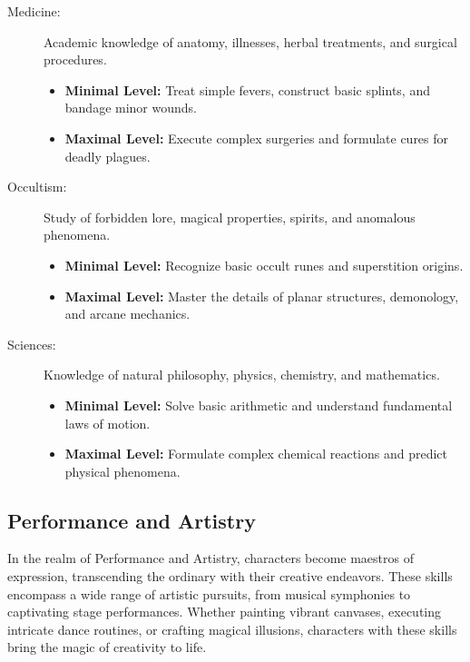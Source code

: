 \begin{description}
    \item[Medicine:] Academic knowledge of anatomy, illnesses, herbal treatments, and surgical procedures.
        \begin{itemize}
            \item \textbf{Minimal Level:} Treat simple fevers, construct basic splints, and bandage minor wounds.
            \item \textbf{Maximal Level:} Execute complex surgeries and formulate cures for deadly plagues.
        \end{itemize}

    \item[Occultism:] Study of forbidden lore, magical properties, spirits, and anomalous phenomena.
        \begin{itemize}
            \item \textbf{Minimal Level:} Recognize basic occult runes and superstition origins.
            \item \textbf{Maximal Level:} Master the details of planar structures, demonology, and arcane mechanics.
        \end{itemize}

    \item[Sciences:] Knowledge of natural philosophy, physics, chemistry, and mathematics.
        \begin{itemize}
            \item \textbf{Minimal Level:} Solve basic arithmetic and understand fundamental laws of motion.
            \item \textbf{Maximal Level:} Formulate complex chemical reactions and predict physical phenomena.
        \end{itemize}
\end{description}

\subsection{\textbf{Performance and Artistry}}

In the realm of Performance and Artistry, characters become maestros of expression, transcending the ordinary with their creative endeavors. These skills encompass a wide range of artistic pursuits, from musical symphonies to captivating stage performances. Whether painting vibrant canvases, executing intricate dance routines, or crafting magical illusions, characters with these skills bring the magic of creativity to life.

